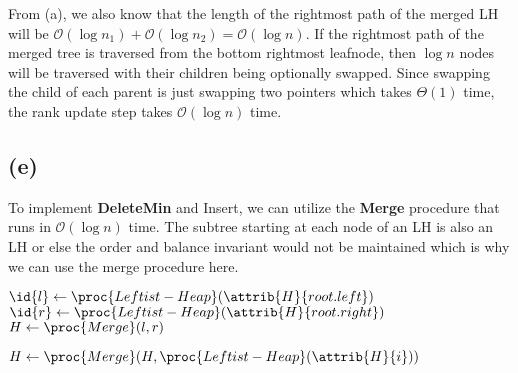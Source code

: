     From (a), we also know that the length of the rightmost path of the merged LH will be $\mathcal{O}(\log{n_1}) + \mathcal{O}(\log{n_2}) = \mathcal{O}(\log{n})$. If the rightmost path of the merged tree is traversed from the bottom rightmost leafnode, then $\log{n}$ nodes will be traversed with their children being optionally swapped. Since swapping the child of each parent is just swapping two pointers which takes $\Theta(1)$ time, the rank update step takes $\mathcal{O}(\log{n})$ time.

    \subsection{(e)}
    To implement \textbf{DeleteMin} and Insert, we can utilize the \textbf{Merge} procedure that runs in $\mathcal{O}(\log{n})$ time. The subtree starting at each node of an LH is also an LH or else the order and balance invariant would not be maintained which is why we can use the merge procedure here.
    
        \begin{codebox}
        \li $\id{l} \gets \proc{Leftist-Heap}(\attrib{H}{root.left})$
        \li $\id{r} \gets \proc{Leftist-Heap}(\attrib{H}{root.right})$
        \li $H \gets \proc{Merge}(l, r)$
        \end{codebox}
        \begin{codebox}
        \li $H \gets \proc{Merge}(H, \proc{Leftist-Heap}(\attrib{H}{i}))$
        \end{codebox}
        